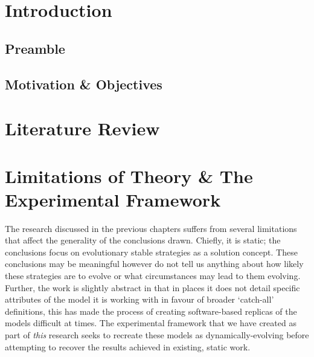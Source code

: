 \documentclass[11pt]{book}
\begin{document}

\tableofcontents
\newpage
\chapter{Introduction}
\section{Preamble}
\section{Motivation \& Objectives}

\chapter{Literature Review}

\chapter[Theoretical \& Experimental Context]{Limitations of Theory \& The Experimental Framework}

The research discussed in the previous chapters suffers from several limitations that affect the generality of the conclusions drawn. 
Chiefly, it is static; the conclusions focus on evolutionary stable strategies as a solution concept.
These conclusions may be meaningful however do not tell us anything about how likely these strategies are to evolve or what circumstances may lead to them evolving.
Further, the work is slightly abstract in that in places it does not detail specific attributes of the model it is working with in favour of broader `catch-all' definitions,
this has made the process of creating software-based replicas of the models difficult at times.
The experimental framework that we have created as part of \textit{this} research seeks to recreate these models as dynamically-evolving before attempting to recover the results achieved in existing, static work.
\end{document}
